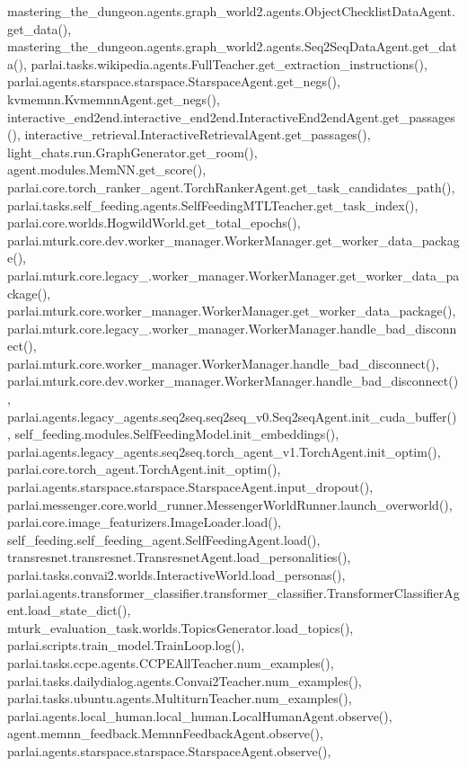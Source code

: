 mastering\+\_\+the\+\_\+dungeon.\+agents.\+graph\+\_\+world2.\+agents.\+Object\+Checklist\+Data\+Agent.\+get\+\_\+data(), mastering\+\_\+the\+\_\+dungeon.\+agents.\+graph\+\_\+world2.\+agents.\+Seq2\+Seq\+Data\+Agent.\+get\+\_\+data(), parlai.\+tasks.\+wikipedia.\+agents.\+Full\+Teacher.\+get\+\_\+extraction\+\_\+instructions(), parlai.\+agents.\+starspace.\+starspace.\+Starspace\+Agent.\+get\+\_\+negs(), kvmemnn.\+Kvmemnn\+Agent.\+get\+\_\+negs(), interactive\+\_\+end2end.\+interactive\+\_\+end2end.\+Interactive\+End2end\+Agent.\+get\+\_\+passages(), interactive\+\_\+retrieval.\+Interactive\+Retrieval\+Agent.\+get\+\_\+passages(), light\+\_\+chats.\+run.\+Graph\+Generator.\+get\+\_\+room(), agent.\+modules.\+Mem\+N\+N.\+get\+\_\+score(), parlai.\+core.\+torch\+\_\+ranker\+\_\+agent.\+Torch\+Ranker\+Agent.\+get\+\_\+task\+\_\+candidates\+\_\+path(), parlai.\+tasks.\+self\+\_\+feeding.\+agents.\+Self\+Feeding\+M\+T\+L\+Teacher.\+get\+\_\+task\+\_\+index(), parlai.\+core.\+worlds.\+Hogwild\+World.\+get\+\_\+total\+\_\+epochs(), parlai.\+mturk.\+core.\+dev.\+worker\+\_\+manager.\+Worker\+Manager.\+get\+\_\+worker\+\_\+data\+\_\+package(), parlai.\+mturk.\+core.\+legacy\+\_.\+worker\+\_\+manager.\+Worker\+Manager.\+get\+\_\+worker\+\_\+data\+\_\+package(), parlai.\+mturk.\+core.\+worker\+\_\+manager.\+Worker\+Manager.\+get\+\_\+worker\+\_\+data\+\_\+package(), parlai.\+mturk.\+core.\+legacy\+\_.\+worker\+\_\+manager.\+Worker\+Manager.\+handle\+\_\+bad\+\_\+disconnect(), parlai.\+mturk.\+core.\+worker\+\_\+manager.\+Worker\+Manager.\+handle\+\_\+bad\+\_\+disconnect(), parlai.\+mturk.\+core.\+dev.\+worker\+\_\+manager.\+Worker\+Manager.\+handle\+\_\+bad\+\_\+disconnect(), parlai.\+agents.\+legacy\+\_\+agents.\+seq2seq.\+seq2seq\+\_\+v0.\+Seq2seq\+Agent.\+init\+\_\+cuda\+\_\+buffer(), self\+\_\+feeding.\+modules.\+Self\+Feeding\+Model.\+init\+\_\+embeddings(), parlai.\+agents.\+legacy\+\_\+agents.\+seq2seq.\+torch\+\_\+agent\+\_\+v1.\+Torch\+Agent.\+init\+\_\+optim(), parlai.\+core.\+torch\+\_\+agent.\+Torch\+Agent.\+init\+\_\+optim(), parlai.\+agents.\+starspace.\+starspace.\+Starspace\+Agent.\+input\+\_\+dropout(), parlai.\+messenger.\+core.\+world\+\_\+runner.\+Messenger\+World\+Runner.\+launch\+\_\+overworld(), parlai.\+core.\+image\+\_\+featurizers.\+Image\+Loader.\+load(), self\+\_\+feeding.\+self\+\_\+feeding\+\_\+agent.\+Self\+Feeding\+Agent.\+load(), transresnet.\+transresnet.\+Transresnet\+Agent.\+load\+\_\+personalities(), parlai.\+tasks.\+convai2.\+worlds.\+Interactive\+World.\+load\+\_\+personas(), parlai.\+agents.\+transformer\+\_\+classifier.\+transformer\+\_\+classifier.\+Transformer\+Classifier\+Agent.\+load\+\_\+state\+\_\+dict(), mturk\+\_\+evaluation\+\_\+task.\+worlds.\+Topics\+Generator.\+load\+\_\+topics(), parlai.\+scripts.\+train\+\_\+model.\+Train\+Loop.\+log(), parlai.\+tasks.\+ccpe.\+agents.\+C\+C\+P\+E\+All\+Teacher.\+num\+\_\+examples(), parlai.\+tasks.\+dailydialog.\+agents.\+Convai2\+Teacher.\+num\+\_\+examples(), parlai.\+tasks.\+ubuntu.\+agents.\+Multiturn\+Teacher.\+num\+\_\+examples(), parlai.\+agents.\+local\+\_\+human.\+local\+\_\+human.\+Local\+Human\+Agent.\+observe(), agent.\+memnn\+\_\+feedback.\+Memnn\+Feedback\+Agent.\+observe(), parlai.\+agents.\+starspace.\+starspace.\+Starspace\+Agent.\+observe(), 